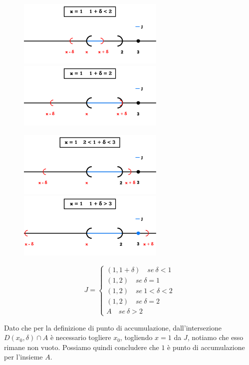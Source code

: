 \documentclass{article}
\begin{document}
\begin{figure}[!h]
    \centering
    \includegraphics[width=7cm]{./images/AccPoints2.pdf}\hfill
    \includegraphics[width=7cm]{./images/AccPoints3.pdf}
\end{figure}

\begin{figure}[!h]
    \centering
    \includegraphics[width=7cm]{./images/AccPoints4.pdf}\hfill
    \includegraphics[width=7cm]{./images/AccPoints5.pdf}
\end{figure}

\begin{equation*}
    J =
    \begin{cases}
    (1, 1 + \delta) \quad se \ \delta < 1 \\
    (1, 2) \quad se \ \delta = 1 \\
    (1, 2) \quad se \ 1 < \delta < 2 \\
    (1, 2) \quad se \ \delta = 2 \\
    A \quad se \ \delta > 2
\end{cases}
\end{equation*}

\noindent Dato che per la definizione di punto di accumulazione, dall'intersezione $D(x_0,\delta) \cap A$ è necessario togliere $x_0$, togliendo $x = 1$ da $J$, notiamo che esso rimane non vuoto. Possiamo quindi concludere che $1$ è punto di accumulazione per l'insieme $A$.
\end{document}
